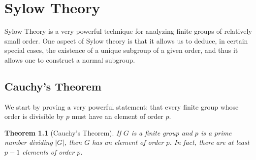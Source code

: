 \documentclass[12pt]{report}
\newtheorem{theorem}{Theorem}[chapter]
\numberwithin{equation}{section}
\numberwithin{theorem}{chapter}
\theoremstyle{definition}
\newtheorem*{basic properties}{Basic Properties}
\newtheorem*{Important Remark}{Important Remark}
\begin{document}
\chapter{Sylow Theory}


Sylow Theory is a very powerful technique for analyzing finite groups of relatively small order. One aspect of Sylow theory is that it allows us to deduce, in certain special cases, the existence of a unique subgroup of a given order, and thus it allows one to construct a normal subgroup. 





\section{Cauchy's Theorem}

We start by proving a very powerful statement: that every finite group whose order is divisible by $p$ must have an element of order $p$.

\begin{theorem}[Cauchy's Theorem]\label{Cauchy's Theorem}\label{Cauchy's Theorem}
 If $G$ is a finite group and $p$ is a prime number dividing $|G|$, then $G$ has an element of order $p$. In fact, there are at least $p-1$ elements of order $p$.
 \end{theorem}
\end{document}

